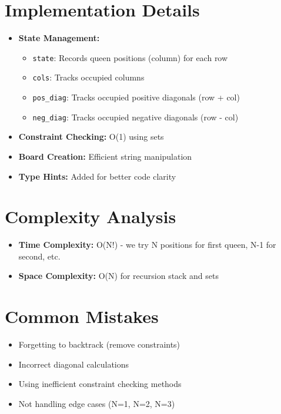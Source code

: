 \section*{Implementation Details}
\begin{itemize}
    \item \textbf{State Management:}
        \begin{itemize}
            \item \texttt{state}: Records queen positions (column) for each row
            \item \texttt{cols}: Tracks occupied columns
            \item \texttt{pos\_diag}: Tracks occupied positive diagonals (row + col)
            \item \texttt{neg\_diag}: Tracks occupied negative diagonals (row - col)
        \end{itemize}
    \item \textbf{Constraint Checking:} O(1) using sets
    \item \textbf{Board Creation:} Efficient string manipulation
    \item \textbf{Type Hints:} Added for better code clarity
\end{itemize}

\section*{Complexity Analysis}
\begin{itemize}
    \item \textbf{Time Complexity:} O(N!) - we try N positions for first queen, N-1 for second, etc.
    \item \textbf{Space Complexity:} O(N) for recursion stack and sets
\end{itemize}

\section*{Common Mistakes}
\begin{itemize}
    \item Forgetting to backtrack (remove constraints)
    \item Incorrect diagonal calculations
    \item Using inefficient constraint checking methods
    \item Not handling edge cases (N=1, N=2, N=3)
\end{itemize}


